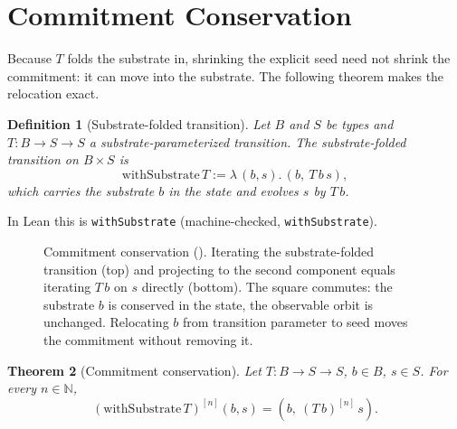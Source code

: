 \documentclass[11pt,a4paper]{article}
\newtheorem{theorem}{Theorem}[section]
\newtheorem{definition}[theorem]{Definition}
\newcommand{\Nat}{\mathbb{N}}
\begin{document}
\section{Commitment Conservation}
\label{sec:conservation}

Because $T$ folds the substrate in, shrinking the explicit seed need not shrink
the commitment: it can move into the substrate.
The following theorem makes the relocation exact.

\begin{definition}[Substrate-folded transition]
\label{def:withsubstrate}
Let $B$ and $S$ be types and $T : B \to S \to S$ a substrate-parameterized
transition.
The \emph{substrate-folded transition} on $B \times S$ is
\[
  \mathrm{withSubstrate}\,T := \lambda\,(b, s).\,(b,\ T\,b\,s),
\]
which carries the substrate $b$ in the state and evolves $s$ by $T\,b$.
\end{definition}

In Lean this is \texttt{withSubstrate}
(machine-checked, \texttt{withSubstrate}).

\begin{figure}[t]
\centering
{}
\caption{Commitment conservation ().
Iterating the substrate-folded transition (top) and projecting to the second
component equals iterating $T\,b$ on $s$ directly (bottom).
The square commutes: the substrate $b$ is conserved in the state, the
observable orbit is unchanged. Relocating $b$ from transition parameter to seed
moves the commitment without removing it.}
\label{fig:conservation}
\end{figure}

\begin{theorem}[Commitment conservation]
\label{thm:conservation}
Let $T : B \to S \to S$, $b \in B$, $s \in S$.
For every $n \in \Nat$,
\[
  (\mathrm{withSubstrate}\,T)^{[n]}(b, s) = (b,\ (T\,b)^{[n]}\,s).
\]
\end{theorem}
\end{document}
